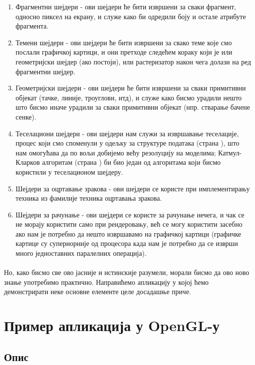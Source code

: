 \documentclass[12pt]{article}
\begin{document}
	\begin{enumerate}
	\item Фрагментни шејдери - ови шејдери ће бити извршени за сваки фрагмент, односно пиксел на екрану, и служе како би одредили боју и остале атрибуте фрагмента.
	\item Темени шејдери - ови шејдери ће бити извршени за свако теме које смо послали графичкој картици, и они претходе следећем кораку који је или геометријски шејдер (ако постоји), или растеризатор након чега долази на ред фрагментни шејдер.
	\item Геометријски шејдери - ови шејдери ће бити извршени за сваки примитивни објекат (тачке, линије, троуглови, итд), и служе како бисмо урадили нешто што бисмо иначе урадили за сваки примитивни објекат (нпр. стварање бачене сенке).
	\item Теселациони шејдери - ови шејдери нам служи за извршавање теселације, процес који смо споменули у одељку за структуре података (страна \pageref{strukturepodatakaproces}), што нам омогућава да по вољи добијемо већу резолуцију на моделима; Катмул-Кларков алгоритам (страна \pageref{katmulklark}) би био један од алгоритама који бисмо користили у теселационом шејдеру.
	\item Шејдери за оцртавање зракова - ови шејдери се користе при имплементирању техника из фамилије техника оцртавања зракова.
	\item Шејдери за рачунање - ови шејдери се користе за рачунање нечега, и чак се не морају користити само при рендеровању, већ се могу користити засебно ако нам је потребно да нешто извршавамо на графичкој картици (графичке картице су супериорније од процесора када нам је потребно да се изврши много једноставних паралелних операција).
	\end{enumerate}
	\paragraph{}
	Но, како бисмо све ово јасније и истинскије разумели, морали бисмо да ово ново знање употребимо практично. Направићемо апликацију у којој ћемо демонстрирати неке основне елементе целе досадашње приче.

	\section{Пример апликација у OpenGL-у}
	
	\subsection{Опис}
	
\end{document}
